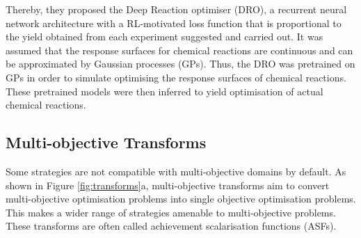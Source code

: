 Thereby, they proposed the Deep Reaction optimiser (DRO), a recurrent neural network architecture with a RL-motivated loss function that is proportional to the yield obtained from each experiment suggested and carried out. It was assumed that the response surfaces for chemical reactions are continuous and can be approximated by Gaussian processes (GPs). Thus, the DRO was pretrained on GPs in order to simulate optimising the response surfaces of chemical reactions. These pretrained models were then inferred to yield optimisation of actual chemical reactions.

\subsection{Multi-objective Transforms}

Some strategies are not compatible with multi-objective domains by default. As shown in Figure \ref{fig:transforms}a, multi-objective transforms aim to convert multi-objective optimisation problems into single objective optimisation problems. This makes a wider range of strategies amenable to multi-objective problems. These transforms are often called achievement scalarisation functions (ASFs).

